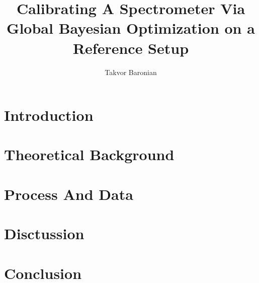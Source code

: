 \documentclass{article}
\title{Calibrating A Spectrometer Via Global Bayesian Optimization on a Reference Setup}
\author{Takvor Baronian}
\begin{document}
\section{Introduction}
\section{Theoretical Background}
\section{Process And Data}
\section{Disctussion}
\section{Conclusion}
\end{document}
